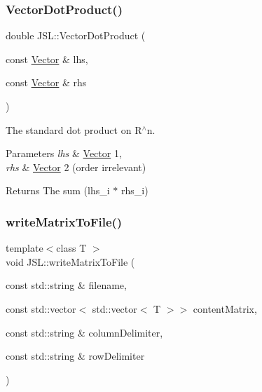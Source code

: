 \subsubsection{\texorpdfstring{Vector\+Dot\+Product()}{VectorDotProduct()}}
{\footnotesize\ttfamily double J\+S\+L\+::\+Vector\+Dot\+Product (\begin{DoxyParamCaption}\item[{const \hyperlink{classJSL_1_1Vector}{Vector} \&}]{lhs,  }\item[{const \hyperlink{classJSL_1_1Vector}{Vector} \&}]{rhs }\end{DoxyParamCaption})\hspace{0.3cm}{\ttfamily [inline]}}



The standard dot product on R$^\wedge$n. 


\begin{DoxyParams}{Parameters}
{\em lhs} & \hyperlink{classJSL_1_1Vector}{Vector} 1, \\
\hline
{\em rhs} & \hyperlink{classJSL_1_1Vector}{Vector} 2 (order irrelevant) \\
\hline
\end{DoxyParams}
\begin{DoxyReturn}{Returns}
The sum (lhs\+\_\+i $\ast$ rhs\+\_\+i) 
\end{DoxyReturn}
\mbox{\label{namespaceJSL_a8c08233b0cb834d4dcde1153b4b8c8c7}} 
\subsubsection{\texorpdfstring{write\+Matrix\+To\+File()}{writeMatrixToFile()}}
{\footnotesize\ttfamily template$<$class T $>$ \\
void J\+S\+L\+::write\+Matrix\+To\+File (\begin{DoxyParamCaption}\item[{const std\+::string \&}]{filename,  }\item[{const std\+::vector$<$ std\+::vector$<$ T $>$$>$}]{content\+Matrix,  }\item[{const std\+::string \&}]{column\+Delimiter,  }\item[{const std\+::string \&}]{row\+Delimiter }\end{DoxyParamCaption})\hspace{0.3cm}{\ttfamily [inline]}}


